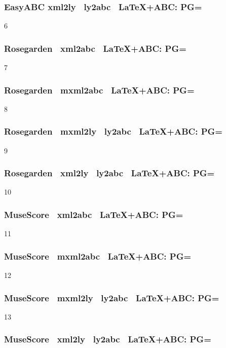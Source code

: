 \subsubsection{Easy\-ABC \ra xml2ly \ra\ ly2abc \ra\ \LaTeX+ABC: PG=}

6

\subsubsection{Rose\-garden \ra\ xml2abc \ra\ \LaTeX+ABC: PG=} 

7

\subsubsection{Rose\-garden \ra\ mxml2abc \ra\ \LaTeX+ABC: PG=} 

8

\subsubsection{Rose\-garden \ra\ mxml2ly \ra\ ly2abc \ra\ \LaTeX+ABC: PG=} 

9

\subsubsection{Rose\-garden \ra\ xml2ly \ra\ ly2abc \ra\ \LaTeX+ABC: PG=} 

10

\subsubsection{Muse\-Score \ra\ xml2abc \ra\ \LaTeX+ABC: PG=} 

11

\subsubsection{Muse\-Score \ra\ mxml2abc \ra\ \LaTeX+ABC: PG=}

12

\subsubsection{Muse\-Score \ra\ mxml2ly \ra\ ly2abc \ra\ \LaTeX+ABC: PG=} 

13

\subsubsection{Muse\-Score \ra\ xml2ly \ra\ ly2abc \ra\ \LaTeX+ABC: PG=}

